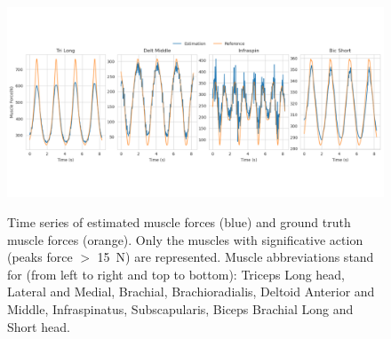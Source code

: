 \begin{figure}[t!] 
\centering 
\includegraphics[width=\textwidth]{figures/Muscle_Forces_MHE.pdf}\\ 
\caption{Time series of estimated muscle forces (blue) and ground truth muscle forces (orange). 
Only the muscles with significative action (peaks force $>$ 15~N) are represented.
Muscle abbreviations stand for (from left to right and top to bottom): Triceps Long head, Lateral and Medial, Brachial, Brachioradialis, Deltoid Anterior and Middle, Infraspinatus, Subscapularis, Biceps Brachial Long and Short head.} 
\label{fig:muscle_forces_MHE} 
\end{figure} 

